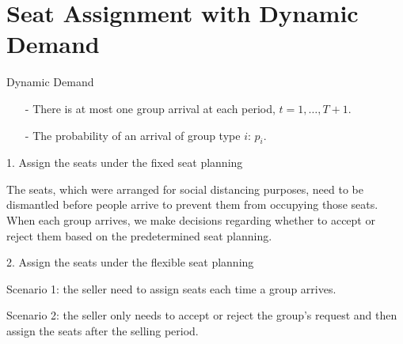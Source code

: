 
\section{Seat Assignment with Dynamic Demand}
    \frame{\sectionpage}

\begin{frame}{Dynamic Demand}
  \begin{itemize}
    \item[-] There is at most one group arrival at each period, $t = 1, \ldots, T+1$. 
    \item[-] The probability of an arrival of group type $i$: $p_i$.  
  \end{itemize}

  1. Assign the seats under the fixed seat planning

  \begin{footnotesize}
    The seats, which were arranged for social distancing purposes, need to be dismantled before people arrive to prevent them from occupying those seats. When each group arrives, we make decisions regarding whether to accept or reject them based on the predetermined seat planning.
  \end{footnotesize}

  \vspace{0.3cm}

  2. Assign the seats under the flexible seat planning

  \begin{footnotesize}
  Scenario 1: the seller need to assign seats each time a group arrives. 
  
  Scenario 2: the seller only needs to accept or reject the group's request and then assign the seats after the selling period.
  \end{footnotesize}
\end{frame}

